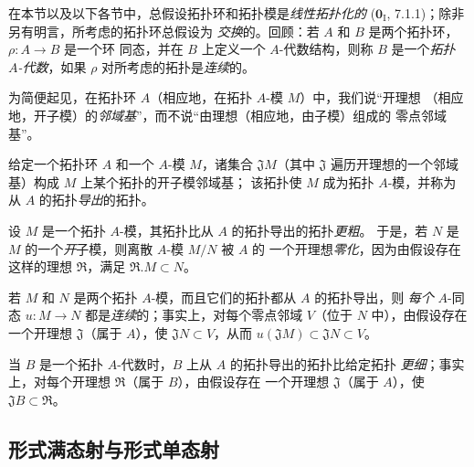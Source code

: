 \begin{env}[19.0.3]
\label{0.19.0.3-fr}
在本节以及以下各节中，总假设拓扑环和拓扑模是\emph{线性拓扑化的}
($\mathbf{0}_{\mathrm I}$, 7.1.1)；除非另有明言，所考虑的拓扑环总假设为
\emph{交换}的。回顾：若 $A$ 和 $B$ 是两个拓扑环，$\rho:A\to B$ 是一个环
同态，并在 $B$ 上定义一个 $A$-代数结构，则称 $B$ 是一个\emph{拓扑
$A$-代数}，如果 $\rho$ 对所考虑的拓扑是\emph{连续}的。

为简便起见，在拓扑环 $A$（相应地，在拓扑 $A$-模 $M$）中，我们说“开理想
（相应地，开子模）的\emph{邻域基}”，而不说“由理想（相应地，由子模）组成的
零点邻域基”。

给定一个拓扑环 $A$ 和一个 $A$-模 $M$，诸集合 $\mathfrak J M$（其中
$\mathfrak J$ 遍历开理想的一个邻域基）构成 $M$ 上某个拓扑的开子模邻域基；
该拓扑使 $M$ 成为拓扑 $A$-模，并称为从 $A$ 的拓扑\emph{导出}的拓扑。

设 $M$ 是一个拓扑 $A$-模，其拓扑比从 $A$ 的拓扑导出的拓扑\emph{更粗}。
于是，若 $N$ 是 $M$ 的一个\emph{开}子模，则离散 $A$-模 $M/N$ 被 $A$ 的
一个开理想\emph{零化}，因为由假设存在这样的理想 $\mathfrak R$，满足
$\mathfrak R.M\subset N$。


若 $M$ 和 $N$ 是两个拓扑 $A$-模，而且它们的拓扑都从 $A$ 的拓扑导出，则
\emph{每个} $A$-同态 $u:M\to N$ 都是\emph{连续}的；事实上，对每个零点邻域
$V$（位于 $N$ 中），由假设存在一个开理想 $\mathfrak J$（属于 $A$），使
$\mathfrak JN\subset V$，从而 $u(\mathfrak JM)\subset\mathfrak JN\subset V$。

当 $B$ 是一个拓扑 $A$-代数时，$B$ 上从 $A$ 的拓扑导出的拓扑比给定拓扑
\emph{更细}；事实上，对每个开理想 $\mathfrak R$（属于 $B$），由假设存在
一个开理想 $\mathfrak J$（属于 $A$），使 $\mathfrak JB\subset\mathfrak R$。
\end{env}

\subsection{形式满态射与形式单态射}
\label{subsection:0.19.1-fr}

